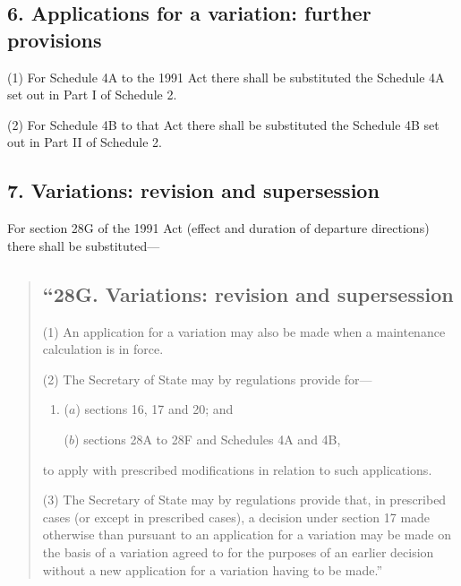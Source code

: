 \documentclass[12pt,a4paper]{article}
\begin{document}

\subsection{6. Applications for a variation: further provisions}

(1) For Schedule 4A to the 1991 Act there shall be substituted the Schedule 4A set out in Part I of Schedule 2. 

(2) For Schedule 4B to that Act there shall be substituted the Schedule 4B set out in Part II of Schedule 2. 


\subsection{7. Variations: revision and supersession}

For section 28G of the 1991 Act (effect and duration of departure directions) there shall be substituted—
\begin{quotation}
\subsection*{“28G. Variations: revision and supersession}

(1) An application for a variation may also be made when a maintenance calculation is in force.

(2) The Secretary of State may by regulations provide for—
\begin{enumerate}\item[]
($a$) sections 16, 17 and 20; and

($b$) sections 28A to 28F and Schedules 4A and 4B,
\end{enumerate}
to apply with prescribed modifications in relation to such applications.

(3) The Secretary of State may by regulations provide that, in prescribed cases (or except in prescribed cases), a decision under section 17 made otherwise than pursuant to an application for a variation may be made on the basis of a variation agreed to for the purposes of an earlier decision without a new application for a variation having to be made.”
\end{quotation}

\end{document}
